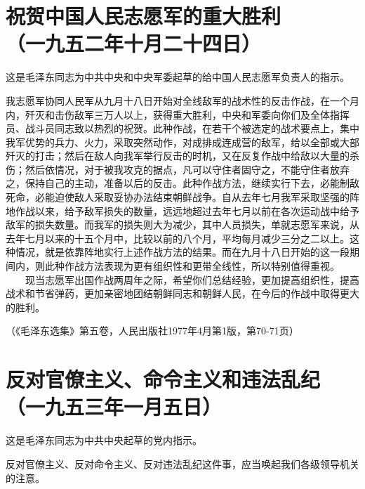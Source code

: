 \documentclass[cn,11pt,chinese]{elegantbook}
\def\myformat#1{\hfil\hfil #1}
\begin{document}
\section*{\myformat{祝贺中国人民志愿军的重大胜利}\\\myformat{（一九五二年十月二十四日）}}
\begin{introduction}\item  这是毛泽东同志为中共中央和中央军委起草的给中国人民志愿军负责人的指示。\end{introduction}
我志愿军协同人民军从九月十八日开始对全线敌军的战术性的反击作战，在一个月内，歼灭和击伤敌军三万人以上，获得重大胜利，中央和军委向你们及全体指挥员、战斗员同志致以热烈的祝贺。此种作战，在若干个被选定的战术要点上，集中我军优势的兵力、火力，采取突然动作，对成排成连成营的敌军，给以全部或大部歼灭的打击；然后在敌人向我军举行反击的时机，又在反复作战中给敌以大量的杀伤；然后依情况，对于被我攻克的据点，凡可以守住者固守之，不能守住者放弃之，保持自己的主动，准备以后的反击。此种作战方法，继续实行下去，必能制敌死命，必能迫使敌人采取妥协办法结束朝鲜战争。自从去年七月我军采取坚强的阵地作战以来，给予敌军损失的数量，远远地超过去年七月以前在各次运动战中给予敌军的损失数量。而我军的损失则大为减少，其中人员损失，单就志愿军来说，从去年七月以来的十五个月中，比较以前的八个月，平均每月减少三分之二以上。这种情况，就是依靠阵地实行上述作战方法的结果。而在九月十八日开始的这一段期间内，则此种作战方法表现为更有组织性和更带全线性，所以特别值得重视。\\
　　现当志愿军出国作战两周年之际，希望你们总结经验，更加提高组织性，提高战术和节省弹药，更加亲密地团结朝鲜同志和朝鲜人民，在今后的作战中取得更大的胜利。\\
\begin{flushright}（《毛泽东选集》第五卷，人民出版社1977年4月第1版，第70-71页）\end{flushright}
\newpage\section*{\myformat{反对官僚主义、命令主义和违法乱纪}\\\myformat{（一九五三年一月五日）}}
\begin{introduction}\item  这是毛泽东同志为中共中央起草的党内指示。\end{introduction}
反对官僚主义、反对命令主义、反对违法乱纪这件事，应当唤起我们各级领导机关的注意。\\
\end{document}
